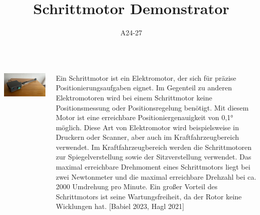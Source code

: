 \documentclass[25pt,a0paper, portrait]{tikzposter}
\title{Schrittmotor Demonstrator}
\author{A24-27}
\begin{document}
 
\maketitle

\begin{columns} 
	
	{
		{
			\begin{tikzfigure}
				\includegraphics[width=\linewidth]{images/DemonstratorDrauf}
			\end{tikzfigure}	
		}
		{
			Ein Schrittmotor ist ein Elektromotor, der sich für präzise Positionierungsaufgaben eignet. Im Gegenteil zu anderen Elektromotoren wird bei einem Schrittmotor keine Positionsmessung oder Positionsregelung benötigt. Mit diesem Motor ist eine erreichbare Positioniergenauigkeit von 0,1° möglich. Diese Art von Elektromotor wird beispielsweise in Druckern oder Scanner, aber auch im Kraftfahrzeugbereich verwendet. Im Kraftfahrzeugbereich werden die Schrittmotoren zur Spiegelverstellung sowie der Sitzverstellung verwendet. Das maximal erreichbare Drehmoment eines Schrittmotors liegt bei zwei Newtonmeter und die maximal erreichbare Drehzahl bei ca. 2000 Umdrehung pro Minute. Ein großer Vorteil des Schrittmotors ist seine Wartungsfreiheit, da der Rotor keine Wicklungen hat. [Babiel 2023, Hagl 2021]
		}
	}



\end{columns}
\end{document}

